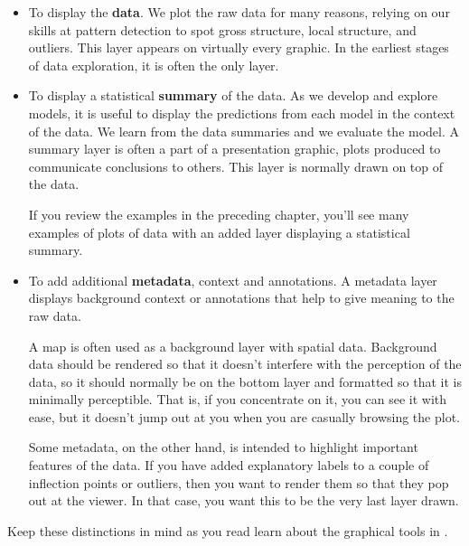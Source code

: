 \begin{itemize}
  \item To display the {\bf data}.  We plot the raw data for many reasons, relying on our skills at pattern detection to spot gross structure, local structure, and outliers.  This layer appears on virtually every graphic.  In the earliest stages of data exploration, it is often the only layer.

  \item To display a statistical {\bf summary} of the data. As we develop and explore models, it is useful to display the predictions from each model in the context of the data. We learn from the data summaries and we evaluate the model. A summary layer is often a part of a presentation graphic, plots produced to communicate conclusions to others. This layer is normally drawn on top of the data.

  If you review the examples in the preceding chapter, you'll see many examples of plots of data with an added layer displaying a statistical summary.

  \item To add additional {\bf metadata}, context and annotations. A metadata layer displays background context or annotations that help to give meaning to the raw data. 
  
  A map is often used as a background layer with spatial data. Background data should be rendered so that it doesn't interfere with the perception of the data, so it should normally be on the bottom layer and formatted so that it is minimally perceptible. That is, if you concentrate on it, you can see it with ease, but it doesn't jump out at you when you are casually browsing the plot.

  Some metadata, on the other hand, is intended to highlight important features of the data. If you have added explanatory labels to a couple of inflection points or outliers, then you want to render them so that they pop out at the viewer. In that case, you want this to be the very last layer drawn.

\end{itemize}

Keep these distinctions in mind as you read learn about the graphical tools in \ggplot.  

